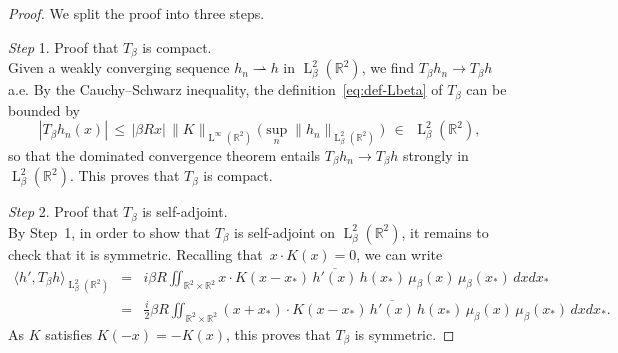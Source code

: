 \documentclass[a4paper,11pt,reqno,noindent]{amsart}
\theoremstyle{plain}
\numberwithin{equation}{section}
\newcommand{\R}{\mathbb R}
\newcommand{\3}{|\!|\!|}
\newcommand{\Ld}{\operatorname{L}}
\newcommand{\step}[1]{\noindent \textit{Step} #1.}
\newcommand{\cvf}{\rightharpoonup}
\begin{document}
\begin{proof}
We split the proof into three steps.

\medskip
\step1 Proof that $T_\beta$ is compact.\\
Given a weakly converging sequence $h_n\cvf h$ in $\Ld^2_\beta(\R^2)$, we find $T_\beta h_n\to T_\beta h$ a.e. By the Cauchy--Schwarz inequality, the definition~\eqref{eq:def-Lbeta} of $T_\beta$ can be bounded by
\[|T_\beta h_n(x)|\,\le\,|\beta Rx|\,\|K\|_{\Ld^\infty(\R^2)}\big(\textstyle\sup_n\|h_n\|_{\Ld^2_\beta(\R^2)}\big)~\,\in\,~\Ld^2_\beta(\R^2),\]
so that the dominated convergence theorem entails $T_\beta h_n\to T_\beta h$ strongly in $\Ld^2_\beta(\R^2)$. This proves that $T_\beta$ is compact.

\medskip
\step2 Proof that $T_\beta$ is self-adjoint.\\
By Step~1, in order to show that $T_\beta$ is self-adjoint on $\Ld^2_\beta(\R^2)$, it remains to check that it is symmetric. Recalling that~\mbox{$x\cdot K(x)=0$}, we can write
\begin{eqnarray*}
\langle h',T_\beta h\rangle_{\Ld^2_\beta(\R^2)}
&=&i\beta R\iint_{\R^2\times\R^2}x\cdot K(x-x_*)\, \overline{h'(x)}\,h(x_*)\,\mu_\beta(x)\,\mu_\beta(x_*)\,dxdx_*\\
&=&\tfrac i2\beta R\iint_{\R^2\times\R^2}(x+x_*)\cdot K(x-x_*)\,\overline{h'(x)}\,h(x_*)\,\mu_\beta(x)\,\mu_\beta(x_*)\,dxdx_*.
\end{eqnarray*}
As $K$ satisfies $K(-x)=-K(x)$, this proves that $T_\beta$ is symmetric.


\end{proof}
\end{document}

